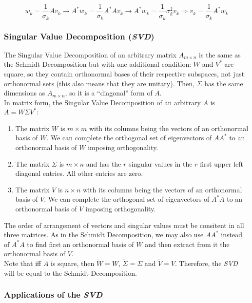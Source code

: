 $$w_k=\frac{1}{\sigma_k} Av_k\rightarrow A^*w_k=\frac{1}{\sigma_k}A^* Av_k\rightarrow A^*w_k=\frac{1}{\sigma_k} \sigma_k^2 v_k\Rightarrow v_k=\frac{1}{\sigma_k} A^*w_k$$

\subsubsection*{Singular Value Decomposition (\textit{SVD})}

The Singular Value Decomposition of an arbitrary matrix $A_{m \times n}$ is the same as the Schmidt Decomposition but with one additional condition: $W$ and $V^*$ are square, so they contain orthonormal bases of their respective subspaces, not just orthonormal sets (this also means that they are unitary). Then, $\Sigma$ has the same dimensions as $A_{m \times n}$, so it is a ``diagonal'' form of $A$.\\


In matrix form, the Singular Value Decomposition of an arbitrary $A$ is $A=W\Sigma V^*$:

\begin{enumerate}[label=(\roman*)]
    \item The matrix $W$ is $m\times m$ with its columns being the vectors of an orthonormal basis of $W$. We can complete the orthogonal set of eigenvectors of $AA^*$ to an orthonormal basis of $W$ imposing orthogonality.
    \item The matrix $\Sigma$ is $m\times n$ and has the $r$ singular values in the $r$ first upper left diagonal entries. All other entries are zero.
    \item The matrix $V$ is $n\times n$ with its columns being the vectors of an orthonormal basis of $V$. We can complete the orthogonal set of eigenvectors of $A^*A$ to an orthonormal basis of $V$ imposing orthogonality.
\end{enumerate}

The order of arrangement of vectors and singular values must be consitent in all three matrices. As in the Schmidt Decomposition, we may also use $AA^*$ instead of $A^*A$ to find first an orthonormal basis of $W$ and then extract from it the orthonormal basis of $V$.\\

Note that iff $A$ is square, then $\widetilde{W}=W$, $\widetilde{\Sigma}=\Sigma$ and $\widetilde{V}=V$. Therefore, the \textit{SVD} will be equal to the Schmidt Decomposition.

\subsubsection*{Applications of the \textit{SVD}}

